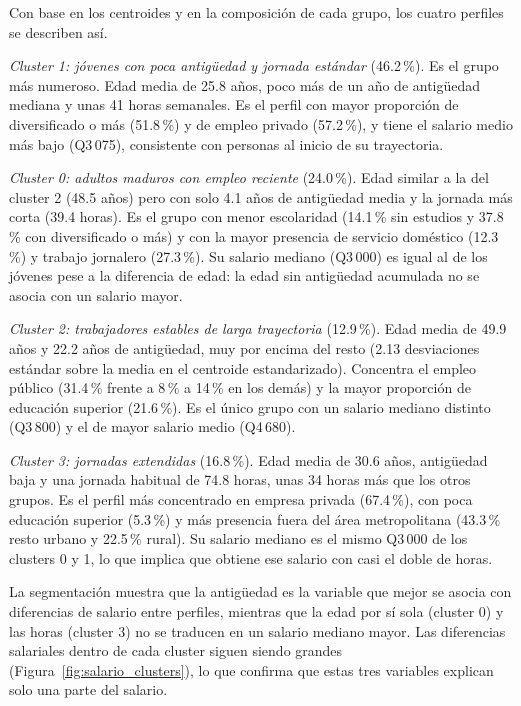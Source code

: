 \documentclass[11pt,a4paper]{article}
\begin{document}
Con base en los centroides y en la composición de cada grupo, los cuatro perfiles se describen así.

\textit{Cluster 1: jóvenes con poca antigüedad y jornada estándar} (46.2\,\%). Es el grupo más numeroso. Edad media de 25.8 años, poco más de un año de antigüedad mediana y unas 41 horas semanales. Es el perfil con mayor proporción de diversificado o más (51.8\,\%) y de empleo privado (57.2\,\%), y tiene el salario medio más bajo (Q3\,075), consistente con personas al inicio de su trayectoria.

\textit{Cluster 0: adultos maduros con empleo reciente} (24.0\,\%). Edad similar a la del cluster 2 (48.5 años) pero con solo 4.1 años de antigüedad media y la jornada más corta (39.4 horas). Es el grupo con menor escolaridad (14.1\,\% sin estudios y 37.8\,\% con diversificado o más) y con la mayor presencia de servicio doméstico (12.3\,\%) y trabajo jornalero (27.3\,\%). Su salario mediano (Q3\,000) es igual al de los jóvenes pese a la diferencia de edad: la edad sin antigüedad acumulada no se asocia con un salario mayor.

\textit{Cluster 2: trabajadores estables de larga trayectoria} (12.9\,\%). Edad media de 49.9 años y 22.2 años de antigüedad, muy por encima del resto (2.13 desviaciones estándar sobre la media en el centroide estandarizado). Concentra el empleo público (31.4\,\% frente a 8\,\% a 14\,\% en los demás) y la mayor proporción de educación superior (21.6\,\%). Es el único grupo con un salario mediano distinto (Q3\,800) y el de mayor salario medio (Q4\,680).

\textit{Cluster 3: jornadas extendidas} (16.8\,\%). Edad media de 30.6 años, antigüedad baja y una jornada habitual de 74.8 horas, unas 34 horas más que los otros grupos. Es el perfil más concentrado en empresa privada (67.4\,\%), con poca educación superior (5.3\,\%) y más presencia fuera del área metropolitana (43.3\,\% resto urbano y 22.5\,\% rural). Su salario mediano es el mismo Q3\,000 de los clusters 0 y 1, lo que implica que obtiene ese salario con casi el doble de horas.

La segmentación muestra que la antigüedad es la variable que mejor se asocia con diferencias de salario entre perfiles, mientras que la edad por sí sola (cluster 0) y las horas (cluster 3) no se traducen en un salario mediano mayor. Las diferencias salariales dentro de cada cluster siguen siendo grandes (Figura~\ref{fig:salario_clusters}), lo que confirma que estas tres variables explican solo una parte del salario.
\end{document}
